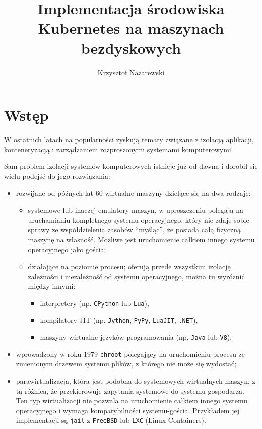 \documentclass[a4paper,12pt,twoside,openany]{report}
\title{Implementacja środowiska Kubernetes na maszynach bezdyskowych}
\author{Krzysztof Nazarewski}
\providecommand{\tightlist}{%
  \setlength{\itemsep}{0pt}\setlength{\parskip}{0pt}}
\newcommand{\passthrough}[1]{#1}
\begin{document}
\maketitle
\hypertarget{wstux119p}{%
\chapter{Wstęp}\label{wstux119p}}

W ostatnich latach na popularności zyskują tematy związane z izolacją
aplikacji, konteneryzacją i zarządzaniem rozproszonymi systemami
komputerowymi.

Sam problem izolacji systemów komputerowych istnieje już od dawna i
dorobił się wielu podejść do jego rozwiązania:

\begin{itemize}
\item
  rozwijane od późnych lat 60 wirtualne maszyny dzielące się na dwa
  rodzaje:

  \begin{itemize}
  \item
    systemowe lub inaczej emulatory maszyn, w uproszczeniu polegają na
    uruchamianiu kompletnego systemu operacyjnego, który nie zdaje sobie
    sprawy ze współdzielenia zasobów ``myśląc'', że posiada całą
    fizyczną maszynę na własność. Możliwe jest uruchomienie całkiem
    innego systemu operacyjnego jako gościa;
  \item
    działające na poziomie procesu; oferują przede wszystkim izolację
    zależności i niezależność od systemu operacyjnego, można tu wyróżnić
    między innymi:

    \begin{itemize}
    \tightlist
    \item
      interpretery (np. \passthrough{\lstinline!CPython!} lub
      \passthrough{\lstinline!Lua!}),
    \item
      kompilatory JIT (np. \passthrough{\lstinline!Jython!},
      \passthrough{\lstinline!PyPy!}, \passthrough{\lstinline!LuaJIT!},
      \passthrough{\lstinline!.NET!}),
    \item
      maszyny wirtualne języków programowania (np.
      \passthrough{\lstinline!Java!} lub \passthrough{\lstinline!V8!});
    \end{itemize}
  \end{itemize}
\item
  wprowadzony w roku 1979 \passthrough{\lstinline!chroot!} polegający na
  uruchomieniu procesu ze zmienionym drzewem systemu plików, z którego
  nie może się wydostać;
\item
  parawirtualizacja, która jest podobna do systemowych wirtualnych
  maszyn, z tą różnicą, że przekierowuje zapytania systemowe do
  systemu-gospodarza. Ten typ wirtualizacji nie pozwala na uruchomienie
  całkiem innego systemu operacyjnego i wymaga kompatybilności
  systemu-gościa. Przykładem jej implementacji są
  \passthrough{\lstinline!jail!} z \passthrough{\lstinline!FreeBSD!} lub
  \passthrough{\lstinline!LXC!} (Linux Containers).
\end{itemize}
\end{document}
